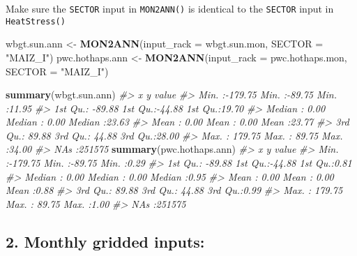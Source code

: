 \documentclass[
]{article}
\newenvironment{Shaded}{\begin{snugshade}}{\end{snugshade}}
\newcommand{\AttributeTok}[1]{\textcolor[rgb]{0.13,0.29,0.53}{#1}}
\newcommand{\CommentTok}[1]{\textcolor[rgb]{0.56,0.35,0.01}{\textit{#1}}}
\newcommand{\FunctionTok}[1]{\textcolor[rgb]{0.13,0.29,0.53}{\textbf{#1}}}
\newcommand{\NormalTok}[1]{#1}
\newcommand{\OtherTok}[1]{\textcolor[rgb]{0.56,0.35,0.01}{#1}}
\newcommand{\StringTok}[1]{\textcolor[rgb]{0.31,0.60,0.02}{#1}}
\begin{document}
Make sure the \texttt{SECTOR} input in \texttt{MON2ANN()} is identical
to the \texttt{SECTOR} input in \texttt{HeatStress()}

\begin{Shaded}
\begin{Highlighting}[]
\NormalTok{wbgt.sun.ann }\OtherTok{\textless{}{-}} \FunctionTok{MON2ANN}\NormalTok{(}\AttributeTok{input\_rack =}\NormalTok{ wbgt.sun.mon, }\AttributeTok{SECTOR =} \StringTok{"MAIZ\_I"}\NormalTok{)}
\NormalTok{pwc.hothaps.ann }\OtherTok{\textless{}{-}} \FunctionTok{MON2ANN}\NormalTok{(}\AttributeTok{input\_rack =}\NormalTok{ pwc.hothaps.mon, }\AttributeTok{SECTOR =} \StringTok{"MAIZ\_I"}\NormalTok{)}

\FunctionTok{summary}\NormalTok{(wbgt.sun.ann)}
\CommentTok{\#\textgreater{}        x                 y              value       }
\CommentTok{\#\textgreater{}  Min.   :{-}179.75   Min.   :{-}89.75   Min.   :11.95   }
\CommentTok{\#\textgreater{}  1st Qu.: {-}89.88   1st Qu.:{-}44.88   1st Qu.:19.70   }
\CommentTok{\#\textgreater{}  Median :   0.00   Median :  0.00   Median :23.63   }
\CommentTok{\#\textgreater{}  Mean   :   0.00   Mean   :  0.00   Mean   :23.77   }
\CommentTok{\#\textgreater{}  3rd Qu.:  89.88   3rd Qu.: 44.88   3rd Qu.:28.00   }
\CommentTok{\#\textgreater{}  Max.   : 179.75   Max.   : 89.75   Max.   :34.00   }
\CommentTok{\#\textgreater{}                                     NA\textquotesingle{}s   :251575}
\FunctionTok{summary}\NormalTok{(pwc.hothaps.ann)}
\CommentTok{\#\textgreater{}        x                 y              value       }
\CommentTok{\#\textgreater{}  Min.   :{-}179.75   Min.   :{-}89.75   Min.   :0.29    }
\CommentTok{\#\textgreater{}  1st Qu.: {-}89.88   1st Qu.:{-}44.88   1st Qu.:0.81    }
\CommentTok{\#\textgreater{}  Median :   0.00   Median :  0.00   Median :0.95    }
\CommentTok{\#\textgreater{}  Mean   :   0.00   Mean   :  0.00   Mean   :0.88    }
\CommentTok{\#\textgreater{}  3rd Qu.:  89.88   3rd Qu.: 44.88   3rd Qu.:0.99    }
\CommentTok{\#\textgreater{}  Max.   : 179.75   Max.   : 89.75   Max.   :1.00    }
\CommentTok{\#\textgreater{}                                     NA\textquotesingle{}s   :251575}
\end{Highlighting}
\end{Shaded}

\subsection{2. Monthly gridded inputs:}\label{monthly-gridded-inputs}
\end{document}
